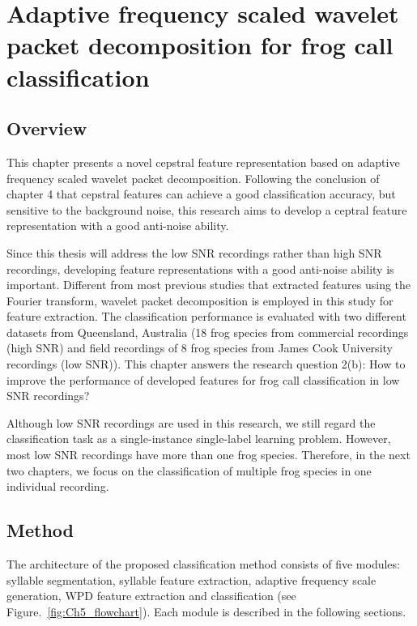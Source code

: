 
\chapter{Adaptive frequency scaled wavelet packet decomposition for frog call classification}
\label{cha:cha5Wavelet}


\section{Overview}
This chapter presents a novel cepstral feature representation based on adaptive frequency scaled wavelet packet decomposition. Following the conclusion of chapter 4 that cepstral features can achieve a good classification accuracy, but sensitive to the background noise, this research aims to develop a ceptral feature representation with a good anti-noise ability.



Since this thesis will address the low SNR recordings rather than high SNR recordings, developing feature representations with a good anti-noise ability is important. Different from most previous studies that extracted features using the Fourier transform, wavelet packet decomposition is employed in this study for feature extraction. The classification performance is evaluated with two different datasets from Queensland, Australia (18 frog species from commercial recordings (high SNR) and field recordings of 8 frog species from James Cook University recordings (low SNR)). This chapter answers the research question 2(b): How to improve the performance of developed features for frog call classification in low SNR recordings? 


Although low SNR recordings are used in this research, we still regard the classification task as a single-instance single-label learning problem.
However, most low SNR recordings have more than one frog species. Therefore, in the next two chapters, we focus on the classification of multiple frog species in one individual recording.





\section{Method}
The architecture of the proposed classification method consists of five modules: syllable segmentation, syllable feature extraction, adaptive frequency scale generation, WPD feature extraction and classification (see Figure.~\ref{fig:Ch5_flowchart}). Each module is described in the following sections. 

